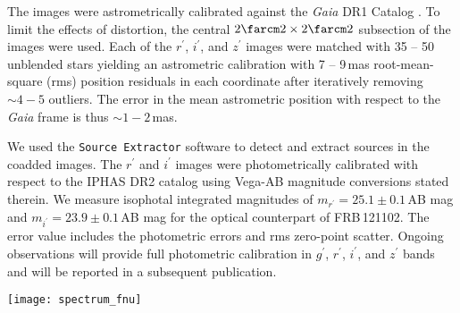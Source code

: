 \documentclass[twocolumn]{aastex61}
\def \frb {FRB\,121102}
\begin{document}
The images were astrometrically calibrated against the \textit{Gaia} DR1 Catalog \citep{bvp+16}. To limit the effects of distortion, the central $2\farcm2\times2\farcm2$ subsection of the images were used. Each of the $r^\prime$, $i^\prime$, and $z^\prime$ images were matched with 35 -- 50 unblended stars yielding an astrometric calibration with 7 -- 9\,mas root-mean-square (rms) position residuals in each coordinate after iteratively removing $\sim4-5$ outliers. The error in the mean astrometric position with respect to the \textit{Gaia} frame is thus $\sim1-2\,$mas.


We used the \texttt{Source Extractor} \citep{ba96} software to detect and extract sources in the coadded images. The $r^\prime$ and $i^\prime$ images were photometrically calibrated with respect to the IPHAS DR2 catalog \citep{bfd+14} using Vega-AB magnitude conversions stated therein. We measure isophotal integrated magnitudes of $m_{r^\prime} = 25.1\pm0.1$\,AB mag and $m_{i^\prime}=23.9\pm0.1$\,AB mag for the optical counterpart of \frb. The error value includes the photometric errors and rms zero-point scatter. Ongoing observations will provide full photometric calibration in $g^\prime$, $r^\prime$, $i^\prime$, and $z^\prime$ bands and will be reported in a subsequent publication. %


\begin{figure*}
    \texttt{[image: spectrum\_fnu]}
  \caption{The co-added spectrum of the host galaxy of \frb,
    the reference object, and the sky contribution (scaled by 10\% and offset by $-3$\,$\upmu$Jy). The spectra
    have been resampled to the instrumental resolution. Prominent
    emission lines are labelled with their rest frame wavelengths. Black horizontal bars denote the wavelength ranges of the filters used for imaging. Most of the wavelength coverage of the $z^\prime$ band is outside the coverage of this plot.}
  \label{fig:spectrum}
\end{figure*}
\end{document}
